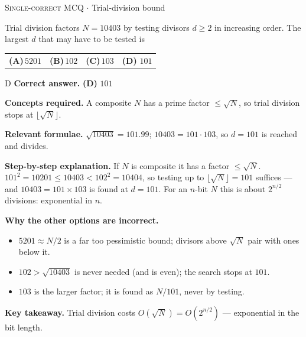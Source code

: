 \documentclass[11pt,a4paper]{article}
\newcommand{\optlabel}[1]{\textbf{(#1)}}
\newcommand{\correctlabel}[1]{\textcolor{okgreen}{\textbf{(#1)}\,\ding{51}}}
\newenvironment{qitem}[1]{\begin{list}{}{\setlength{\leftmargin}{3.3em}\setlength{\labelwidth}{3.1em}%
  \setlength{\labelsep}{0.2em}\setlength{\topsep}{3pt}\setlength{\parsep}{3pt}}\item[\textbf{Q.#1}\hfill]}{\end{list}}
\newcommand{\qsep}{\par\vspace{2pt}{\color{black!15}\hrule}\vspace{4pt}}
\newcommand{\qmeta}[2]{{\footnotesize\color{black!60}\textsc{#1} \;$\cdot$\; #2}\par}
\begin{document}
\begin{qitem}{13}
\qmeta{Single-correct MCQ}{Trial-division bound}
Trial division factors $N = 10403$ by testing divisors $d \ge 2$ in increasing order. The largest $d$ that may have to be tested is
\par\smallskip\noindent\begin{tabularx}{\linewidth}{@{}*{4}{L}@{}}
\optlabel{A}\,$5201$ & \optlabel{B}\,$102$ & \optlabel{C}\,$103$ & \correctlabel{D}\,$101$
\end{tabularx}
\end{qitem}
\begin{solbox}{D}
\textbf{\color{brand}Correct answer.} \textcolor{okgreen}{\textbf{(D)}} $101$

\textbf{\color{brand}Concepts required.} A composite $N$ has a prime factor $\le \sqrt N$, so trial division stops at $\lfloor\sqrt N\rfloor$.

\textbf{\color{brand}Relevant formulae.} $\sqrt{10403} = 101.99$; $10403 = 101\cdot103$, so $d = 101$ is reached and divides.

\textbf{\color{brand}Step-by-step explanation.} If $N$ is composite it has a factor $\le\sqrt N$. $101^2 = 10201 \le 10403 < 102^2 = 10404$, so testing up to $\lfloor\sqrt N\rfloor = 101$ suffices
--- and $10403 = 101\times103$ is found at $d = 101$. For an $n$-bit $N$ this is about $2^{n/2}$ divisions: exponential in $n$.

\textbf{\color{brand}Why the other options are incorrect.}
\begin{itemize}[leftmargin=2.4em, itemsep=1pt, topsep=2pt]
\item[\textbf{(A)}] $5201 \approx N/2$ is a far too pessimistic bound; divisors above $\sqrt N$ pair with ones below it.
\item[\textbf{(B)}] $102 > \sqrt{10403}$ is never needed (and is even); the search stops at $101$.
\item[\textbf{(C)}] $103$ is the larger factor; it is found as $N/101$, never by testing.
\end{itemize}
\textbf{\color{brand}Key takeaway.} Trial division costs $O(\sqrt N) = O(2^{n/2})$ --- exponential in the bit length.
\end{solbox}
\qsep
\end{document}
